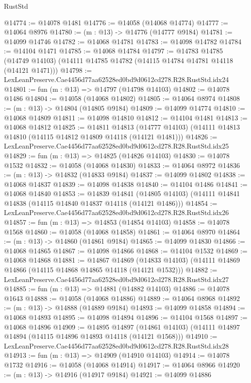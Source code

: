 \begin{lexlean}{RustStd}
\begin{coremodule}
@14774 := @14078 @1481
@14776 := @14058 (@14068 @14774)
@14777 := @14064 @8976
@14780 := (m : @13) -> @14776 (@14777 @9184)
@14781 := @14099 @14746
@14782 := @14068 @14781
@14783 := @14098 @14782
@14784 := @14104 @1471
@14785 := @14068 @14784
@14797 := @14783
    @14785
    (@14749 @14103)
    (@14111 @14785 @14782 (@14115 @14784 @14781 @14118 (@14121 @1471)))
@14798 := LexLeanPreserve.Cae4456d77aa62528ed0bd9d0612cd278.R28.RustStd.idx24
@14801 := fun (m : @13) => @14797 (@14798 @14103)
@14802 := @14078 @1486
@14804 := @14058 (@14068 @14802)
@14805 := @14064 @8974
@14808 := (m : @13) -> @14804 (@14805 @9184)
@14809 := @14099 @14774
@14810 := @14068 @14809
@14811 := @14098 @14810
@14812 := @14104 @1481
@14813 := @14068 @14812
@14825 := @14811
    @14813
    (@14777 @14103)
    (@14111 @14813 @14810 (@14115 @14812 @14809 @14118 (@14121 @1481)))
@14826 := LexLeanPreserve.Cae4456d77aa62528ed0bd9d0612cd278.R28.RustStd.idx25
@14829 := fun (m : @13) => @14825 (@14826 @14103)
@14830 := @14078 @1532
@14832 := @14058 (@14068 @14830)
@14833 := @14064 @8972
@14836 := (m : @13) -> @14832 (@14833 @9184)
@14837 := @14099 @14802
@14838 := @14068 @14837
@14839 := @14098 @14838
@14840 := @14104 @1486
@14841 := @14068 @14840
@14853 := @14839
    @14841
    (@14805 @14103)
    (@14111 @14841 @14838 (@14115 @14840 @14837 @14118 (@14121 @1486)))
@14854 := LexLeanPreserve.Cae4456d77aa62528ed0bd9d0612cd278.R28.RustStd.idx26
@14857 := fun (m : @13) => @14853 (@14854 @14103)
@14858 := @14078 @1568
@14860 := @14058 (@14068 @14858)
@14861 := @14064 @8970
@14864 := (m : @13) -> @14860 (@14861 @9184)
@14865 := @14099 @14830
@14866 := @14068 @14865
@14867 := @14098 @14866
@14868 := @14104 @1532
@14869 := @14068 @14868
@14881 := @14867
    @14869
    (@14833 @14103)
    (@14111 @14869 @14866 (@14115 @14868 @14865 @14118 (@14121 @1532)))
@14882 := LexLeanPreserve.Cae4456d77aa62528ed0bd9d0612cd278.R28.RustStd.idx27
@14885 := fun (m : @13) => @14881 (@14882 @14103)
@14886 := @14078 @1643
@14888 := @14058 (@14068 @14886)
@14889 := @14064 @8968
@14892 := (m : @13) -> @14888 (@14889 @9184)
@14893 := @14099 @14858
@14894 := @14068 @14893
@14895 := @14098 @14894
@14896 := @14104 @1568
@14897 := @14068 @14896
@14909 := @14895
    @14897
    (@14861 @14103)
    (@14111 @14897 @14894 (@14115 @14896 @14893 @14118 (@14121 @1568)))
@14910 := LexLeanPreserve.Cae4456d77aa62528ed0bd9d0612cd278.R28.RustStd.idx28
@14913 := fun (m : @13) => @14909 (@14910 @14103)
@14914 := @14078 @1732
@14916 := @14058 (@14068 @14914)
@14917 := @14064 @8966
@14920 := (m : @13) -> @14916 (@14917 @9184)
@14921 := @14099 @14886

\end{coremodule}
\end{lexlean}
